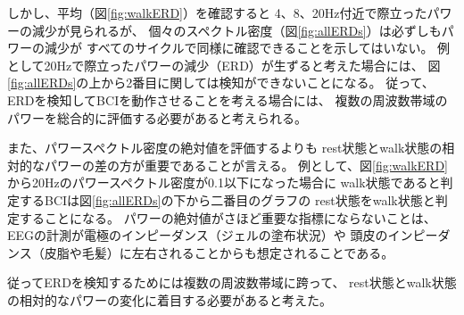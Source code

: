 しかし、平均（図\ref{fig:walkERD}）を確認すると
4、8、20Hz付近で際立ったパワーの減少が見られるが、
個々のスペクトル密度（図\ref{fig:allERDs}）は必ずしもパワーの減少が
すべてのサイクルで同様に確認できることを示してはいない。
例として20Hzで際立ったパワーの減少（ERD）が生ずると考えた場合には、
図\ref{fig:allERDs}の上から2番目に関しては検知ができないことになる。
従って、ERDを検知してBCIを動作させることを考える場合には、
複数の周波数帯域のパワーを総合的に評価する必要があると考えられる。

また、パワースペクトル密度の絶対値を評価するよりも
rest状態とwalk状態の相対的なパワーの差の方が重要であることが言える。
例として、図\ref{fig:walkERD}から20Hzのパワースペクトル密度が0.1以下になった場合に
walk状態であると判定するBCIは図\ref{fig:allERDs}の下から二番目のグラフの
rest状態をwalk状態と判定することになる。
パワーの絶対値がさほど重要な指標にならないことは、
EEGの計測が電極のインピーダンス（ジェルの塗布状況）や
頭皮のインピーダンス（皮脂や毛髪）に左右されることからも想定されることである。

従ってERDを検知するためには複数の周波数帯域に跨って、
rest状態とwalk状態の相対的なパワーの変化に着目する必要があると考えた。


